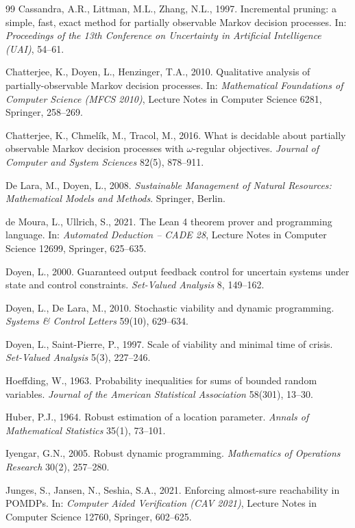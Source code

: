 \begin{thebibliography}{99}
 Cassandra, A.R., Littman, M.L., Zhang, N.L., 1997. Incremental pruning: a simple, fast, exact method for partially observable Markov decision processes. In: \emph{Proceedings of the 13th Conference on Uncertainty in Artificial Intelligence (UAI)}, 54--61.

 Chatterjee, K., Doyen, L., Henzinger, T.A., 2010. Qualitative analysis of partially-observable Markov decision processes. In: \emph{Mathematical Foundations of Computer Science (MFCS 2010)}, Lecture Notes in Computer Science 6281, Springer, 258--269.

 Chatterjee, K., Chmel\'ik, M., Tracol, M., 2016. What is decidable about partially observable Markov decision processes with $\omega$-regular objectives. \emph{Journal of Computer and System Sciences} 82(5), 878--911.

 De Lara, M., Doyen, L., 2008. \emph{Sustainable Management of Natural Resources: Mathematical Models and Methods}. Springer, Berlin.

 de Moura, L., Ullrich, S., 2021. The Lean 4 theorem prover and programming language. In: \emph{Automated Deduction -- CADE 28}, Lecture Notes in Computer Science 12699, Springer, 625--635.

 Doyen, L., 2000. Guaranteed output feedback control for uncertain systems under state and control constraints. \emph{Set-Valued Analysis} 8, 149--162.

 Doyen, L., De Lara, M., 2010. Stochastic viability and dynamic programming. \emph{Systems \& Control Letters} 59(10), 629--634.

 Doyen, L., Saint-Pierre, P., 1997. Scale of viability and minimal time of crisis. \emph{Set-Valued Analysis} 5(3), 227--246.

 Hoeffding, W., 1963. Probability inequalities for sums of bounded random variables. \emph{Journal of the American Statistical Association} 58(301), 13--30.

 Huber, P.J., 1964. Robust estimation of a location parameter. \emph{Annals of Mathematical Statistics} 35(1), 73--101.

 Iyengar, G.N., 2005. Robust dynamic programming. \emph{Mathematics of Operations Research} 30(2), 257--280.

 Junges, S., Jansen, N., Seshia, S.A., 2021. Enforcing almost-sure reachability in POMDPs. In: \emph{Computer Aided Verification (CAV 2021)}, Lecture Notes in Computer Science 12760, Springer, 602--625.


\end{thebibliography}
